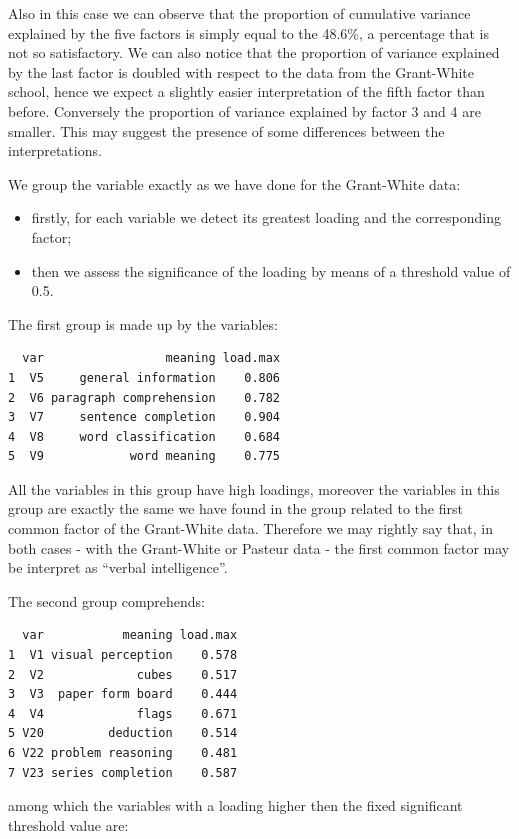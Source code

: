 \documentclass[
  letterpaper,
  DIV=11,
  numbers=noendperiod]{scrartcl}
\providecommand{\tightlist}{%
  \setlength{\itemsep}{0pt}\setlength{\parskip}{0pt}}\usepackage{longtable,booktabs,array}
\begin{document}
Also in this case we can observe that the proportion of cumulative
variance explained by the five factors is simply equal to the 48.6\%, a
percentage that is not so satisfactory. We can also notice that the
proportion of variance explained by the last factor is doubled with
respect to the data from the Grant-White school, hence we expect a
slightly easier interpretation of the fifth factor than before.
Conversely the proportion of variance explained by factor 3 and 4 are
smaller. This may suggest the presence of some differences between the
interpretations.

We group the variable exactly as we have done for the Grant-White data:

\begin{itemize}
\tightlist
\item
  firstly, for each variable we detect its greatest loading and the
  corresponding factor;
\item
  then we assess the significance of the loading by means of a threshold
  value of 0.5.
\end{itemize}

The first group is made up by the variables:

\begin{verbatim}
  var                 meaning load.max
1  V5     general information    0.806
2  V6 paragraph comprehension    0.782
3  V7     sentence completion    0.904
4  V8     word classification    0.684
5  V9            word meaning    0.775
\end{verbatim}

All the variables in this group have high loadings, moreover the
variables in this group are exactly the same we have found in the group
related to the first common factor of the Grant-White data. Therefore we
may rightly say that, in both cases - with the Grant-White or Pasteur
data - the first common factor may be interpret as ``verbal
intelligence''.

The second group comprehends:

\begin{verbatim}
  var           meaning load.max
1  V1 visual perception    0.578
2  V2             cubes    0.517
3  V3  paper form board    0.444
4  V4             flags    0.671
5 V20         deduction    0.514
6 V22 problem reasoning    0.481
7 V23 series completion    0.587
\end{verbatim}

among which the variables with a loading higher then the fixed
significant threshold value are:
\end{document}
